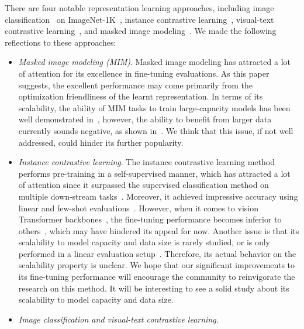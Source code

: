 \documentclass{article}
\begin{document}
There are four notable representation learning approaches, including image classification~\cite{alexnet} on ImageNet-1K~\cite{deng2009imagenet}, instance contrastive learning~\cite{dosovitskiy2014exemplarcnn,he2019moco}, visual-text contrastive learning~\cite{radford2021clip,jia2021align}, and masked image modeling~\cite{bao2021beit,xie2021simmim,MaskedAutoencoders2021}. We made the following reflections to these approaches:
\begin{itemize}
   \item \emph{Masked image modeling (MIM)}. Masked image modeling has attracted a lot of attention for its excellence in fine-tuning evaluations. As this paper suggests, the excellent performance may come primarily from the optimization friendliness of the learnt representation. 
   In terms of its scalability, the ability of MIM tasks to train large-capacity models has been well demonstrated in~\cite{MaskedAutoencoders2021,xie2021simmim,swinv2}, however, the ability to benefit from larger data currently sounds negative, as shown in~\cite{el2021large}. We think that this issue, if not well addressed, could hinder its further popularity.
   \item \emph{Instance contrastive learning}. The instance contrastive learning method performs pre-training in a self-supervised manner, which has attracted a lot of attention since it surpassed the supervised classification method on multiple down-stream tasks~\cite{he2019moco}. Moreover, it achieved impressive accuracy using linear and few-shot evaluations~\cite{chen2020big}. However, when it comes to vision Transformer backbones~\cite{dosovitskiy2020vit,liu2021swin}, the fine-tuning performance becomes inferior to others~\cite{xie2021self,li2021esvit}, which may have hindered its appeal for now. Another issue is that its scalability to model capacity and data size is rarely studied, or is only performed in a linear evaluation setup~\cite{Tian_2021_ICCV}. Therefore, its actual behavior on the scalability property is unclear. We hope that our significant improvements to its fine-tuning performance will encourage the community to reinvigorate the research on this method. It will be interesting to see a solid study about its scalability to model capacity and data size.
   \item \emph{Image classification and visual-text contrastive learning}. 

\end{itemize}
\end{document}
